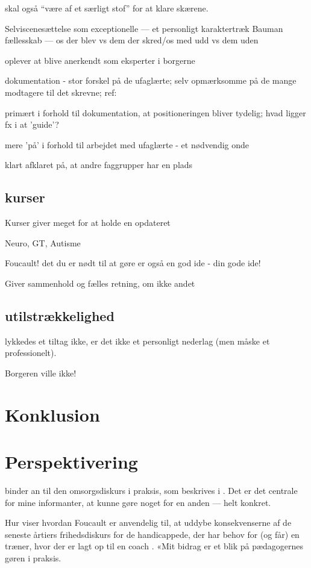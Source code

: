 skal også “være af et særligt stof” for at klare skærene.

Selviscenesættelse som exceptionelle --- et personligt karaktertræk
Bauman fællesskab — os der blev vs dem der skred/os med udd vs dem uden

oplever at blive anerkendt som eksperter i borgerne

dokumentation - stor forskel på de ufaglærte; selv opmærksomme på de mange modtagere til det skrevne; ref: \autocite{hjerrildNarViSkriver2017, andersenUndervisningInstitutionOg2019}

primært i forhold til dokumentation, at positioneringen bliver tydelig; hvad ligger fx i at 'guide'?

mere 'på' i forhold til arbejdet med ufaglærte - et nødvendig onde

klart afklaret på, at andre faggrupper har en plads

\subsection{kurser}
Kurser giver meget for at holde en opdateret

Neuro, GT, Autisme

Foucault! det du er nødt til at gøre er også en god ide - din gode ide!

Giver sammenhold og fælles retning, om ikke andet

\subsection{utilstrækkelighed}
lykkedes et tiltag ikke, er det ikke et personligt nederlag (men måske et professionelt).

Borgeren ville ikke!

\section{Konklusion}

\section{Perspektivering}
binder an til den omsorgsdiskurs i praksis, som beskrives i .
Det er det centrale for mine informanter, at kunne gøre noget for en anden — helt konkret.

Hur viser hvordan Foucault er anvendelig til, at uddybe konsekvenserne af de seneste årtiers frihedsdiskurs for de handicappede, der har behov for (og får) en træner, hvor der er lagt op til en coach \autocite{hurFrigorelsensMagt2015}.
«Mit bidrag er et blik på pædagogernes gøren i praksis.

